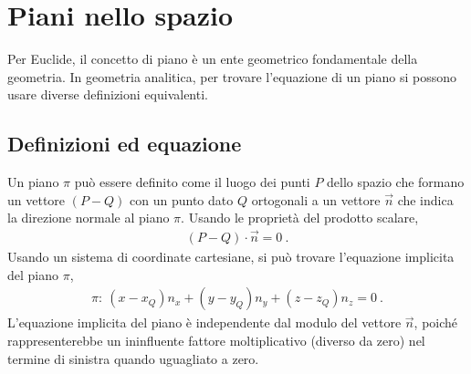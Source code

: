 \documentclass[letterpaper,10pt,italian]{jupyterBook}
\begin{document}
\sphinxstepscope


\section{Piani nello spazio}
\label{\detokenize{ch/analytic_geometry/analytic_geometry_3d/planes:piani-nello-spazio}}\label{\detokenize{ch/analytic_geometry/analytic_geometry_3d/planes:geometry-analytic-3d-planes}}\label{\detokenize{ch/analytic_geometry/analytic_geometry_3d/planes::doc}}
\sphinxAtStartPar
Per Euclide, il concetto di piano è un ente geometrico fondamentale della geometria. In geometria analitica, per trovare l’equazione di un piano si possono usare diverse definizioni equivalenti.


\subsection{Definizioni ed equazione}
\label{\detokenize{ch/analytic_geometry/analytic_geometry_3d/planes:definizioni-ed-equazione}}\label{\detokenize{ch/analytic_geometry/analytic_geometry_3d/planes:geometry-analytic-3d-planes-def}}
\sphinxAtStartPar
{}
Un piano \(\pi\) può essere definito come il luogo dei punti \(P\) dello spazio che formano un vettore \((P-Q)\) con un punto dato \(Q\) ortogonali a un vettore \(\overrightarrow{n}\) che indica la direzione normale al piano \(\pi\). Usando le proprietà del prodotto scalare,
\begin{equation*}
\begin{split}(P-Q) \cdot \overrightarrow{n} = 0 \ .\end{split}
\end{equation*}
\sphinxAtStartPar
Usando un sistema di coordinate cartesiane, si può trovare l’equazione implicita del piano \(\pi\),
\begin{equation}\label{equation:ch/analytic_geometry/analytic_geometry_3d/planes:eq:geometry:analytic:3d:planes:def-1}
\begin{split}\pi: \ (x - x_Q) n_x + (y - y_Q) n_y + (z - z_Q) n_z = 0 \ .\end{split}
\end{equation}
\sphinxAtStartPar
{} L’equazione implicita del piano è independente dal modulo del vettore \(\vec{n}\), poiché rappresenterebbe un ininfluente fattore moltiplicativo (diverso da zero) nel termine di sinistra quando uguagliato a zero.
\end{document}
